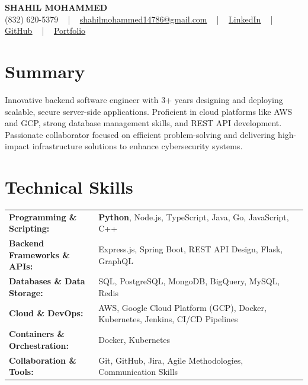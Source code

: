 \documentclass[letterpaper,11pt]{article}
\begin{document}
\begin{center}
    {\fontsize{14pt}{12pt}\selectfont \textbf{\MakeUppercase{Shahil Mohammed}}}\\ \vspace{2pt}
    \fontsize{10pt}{12pt}\selectfont (832) 620-5379 ~ | ~ \href{mailto:shahilmohammed14786@gmail.com}{shahilmohammed14786@gmail.com} ~ | ~  
    \href{https://www.linkedin.com/in/shahil-mohammed-9652931a1/}{\color{blue}\underline{LinkedIn}}  ~ | ~ 
    \href{https://github.com/freakbeast14}{\color{blue}\underline{GitHub}} ~ | ~ 
    \href{https://shahil-mohammed.netlify.app/}{\color{blue}\underline{Portfolio}}
    \vspace{-8pt}
\end{center}

\section{Summary}
\fontsize{9pt}{10pt}\selectfont
Innovative backend software engineer with 3+ years designing and deploying scalable, secure server-side applications. Proficient in cloud platforms like AWS and GCP, strong database management skills, and REST API development. Passionate collaborator focused on efficient problem-solving and delivering high-impact infrastructure solutions to enhance cybersecurity systems.

 \vspace{-5pt}
 
\section{Technical Skills}
        \vspace{-14pt}
        \begin{table}[h]
            \fontsize{9pt}{10pt}\selectfont
            \begin{tabular}{p{0.3\linewidth} p{0.7\linewidth}}
                \textbf{Programming \& Scripting:} & \textbf{Python}, Node.js, TypeScript, Java, Go, JavaScript, C++ \\
                \textbf{Backend Frameworks \& APIs:} & Express.js, Spring Boot, REST API Design, Flask, GraphQL \\
                \textbf{Databases \& Data Storage:} & SQL, PostgreSQL, MongoDB, BigQuery, MySQL, Redis \\
                \textbf{Cloud \& DevOps:} & AWS, Google Cloud Platform (GCP), Docker, Kubernetes, Jenkins, CI/CD Pipelines \\
                \textbf{Containers \& Orchestration:} & Docker, Kubernetes \\
                \textbf{Collaboration \& Tools:} & Git, GitHub, Jira, Agile Methodologies, Communication Skills \\
            \end{tabular}
        \end{table}
 \vspace{-15pt}
 
\end{document}
